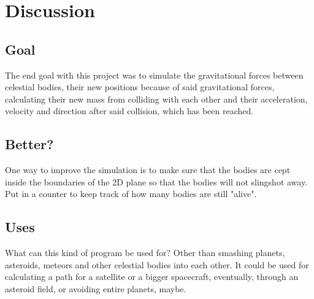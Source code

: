\documentclass[11pt]{article}
\begin{document}
\section{Discussion}
\subsection{Goal}
The end goal with this project was to simulate the gravitational forces between celestial bodies, their new positions because of said gravitational forces, calculating their new mass from colliding with each other and their acceleration, velocity and direction after said collision, which has been reached.
\subsection{Better?}
One way to improve the simulation is to make sure that the bodies are cept inside the boundaries of the 2D plane so that the bodies will not slingshot away. Put in a counter to keep track of how many bodies are still "alive". 
\subsection{Uses}
What can this kind of program be used for? Other than smashing planets, asteroids, meteors and other celestial bodies into each other. 
It could be used for calculating a path for a satellite or a bigger spacecraft, eventually, through an asteroid field, or avoiding entire planets, maybe. 

\printbibliography
\end{document}
